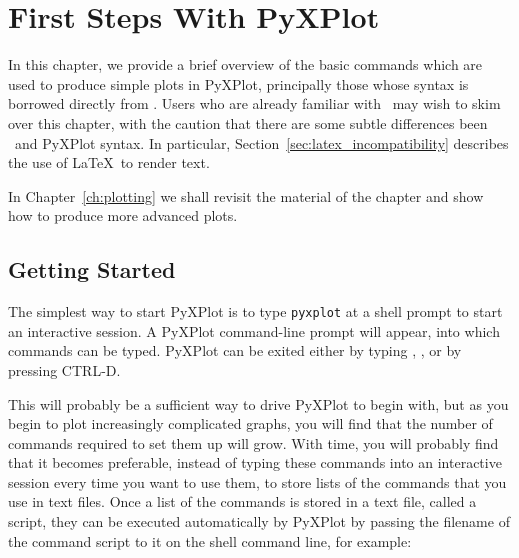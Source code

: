 %
%
%
%
%



\chapter{First Steps With PyXPlot}
\label{ch:first_steps}

In this chapter, we provide a brief overview of the basic commands which are
used to produce simple plots in PyXPlot, principally those whose syntax is
borrowed directly from \gnuplot. Users who are already familiar with \gnuplot\
may wish to skim over this chapter, with the caution that there are some subtle
differences been \gnuplot\ and PyXPlot syntax. In particular,
Section~\ref{sec:latex_incompatibility} describes the use of \LaTeX\ to render
text.

In Chapter~\ref{ch:plotting} we shall revisit the material of the chapter and
show how to produce more advanced plots.

\section{Getting Started}

The simplest way to start PyXPlot is to type {\tt pyxplot} at a shell prompt
to start an interactive session. A PyXPlot command-line prompt will appear,
into which commands can be typed. PyXPlot can be exited either by typing
\indcmdts{exit}, \indcmdts{quit}, or by pressing CTRL-D.

This will probably be a sufficient way to drive PyXPlot to begin with, but as
you begin to plot increasingly complicated graphs, you will find that the
number of commands required to set them up will grow. With time, you will
probably find that it becomes preferable, instead of typing these commands into
an interactive session every time you want to use them, to store lists of the
commands that you use in text files. Once a list of the commands is stored in a
text file, called a script, they can be executed automatically by PyXPlot by
passing the filename of the command script to it on the shell command line, for
example:\index{command-line syntax}

